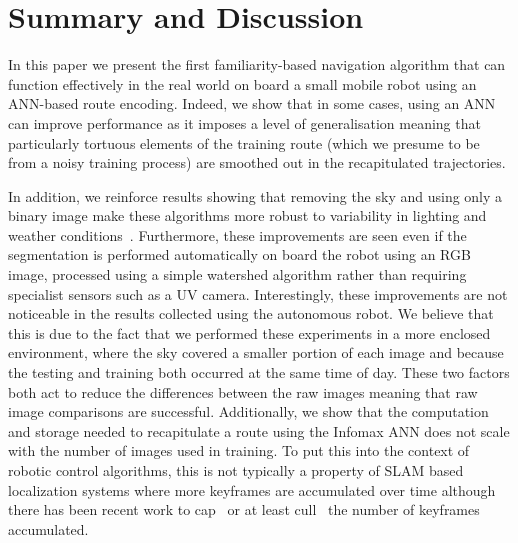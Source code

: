 \documentclass[letterpaper]{article}
\begin{document}
\section{Summary and Discussion}
In this paper we present the first familiarity-based navigation algorithm that can function effectively in the real world on board a small mobile robot using an ANN-based route encoding. 
Indeed, we show that in some cases, using an ANN can improve performance as it imposes a level of generalisation meaning that particularly tortuous elements of the training route (which we presume to be from a noisy training process) are smoothed out in the recapitulated trajectories.

In addition, we reinforce results showing that removing the sky and using only a binary image make these algorithms more robust to variability in lighting and weather conditions~\citep{Philippides2011,Stone2014}. 
Furthermore, these improvements are seen even if the segmentation is performed automatically on board the robot using an RGB image, processed using a simple watershed algorithm rather than requiring specialist sensors such as a UV camera.
Interestingly, these improvements are not noticeable in the results collected using the autonomous robot.
We believe that this is due to the fact that we performed these experiments in a more enclosed environment, where the sky covered a smaller portion of each image and because the testing and training both occurred at the same time of day.
These two factors both act to reduce the differences between the raw images meaning that raw image comparisons are successful.
Additionally, we show that the computation and storage needed to recapitulate a route using the Infomax ANN does not scale with the number of images used in training.
To put this into the context of robotic control algorithms, this is not typically a property of SLAM based localization systems where more keyframes are accumulated over time although there has been recent work to cap~\citep{Maddern2012} or at least cull~\citep{Mur-Artal2015} the number of keyframes accumulated.
\end{document}
